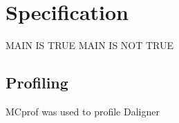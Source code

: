 \documentclass[../main/thesis.tex]{subfiles}
\begin{document}
\chapter{Specification}
\ifdefined\main
\acresetall
MAIN IS TRUE
\newcommand{\code}{../3_concept/code/}
\else
MAIN IS NOT TRUE

\fi

\section{Profiling}

MCprof \cite{mcprof1}\cite{mcprof2} was used to profile Daligner
\end{document}
